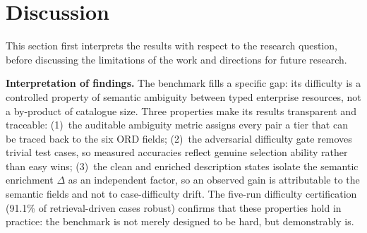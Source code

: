 \documentclass[10pt,twocolumn]{article}
\begin{document}
\section{Discussion}
\label{sec:discussion}

This section first interprets the results with respect to the research question, before discussing the limitations of the work and directions for future research.

\textbf{Interpretation of findings.} The benchmark fills a specific gap: its difficulty is a controlled property of semantic ambiguity between typed enterprise resources, not a by-product of catalogue size. Three properties make its results transparent and traceable: (1)~the auditable ambiguity metric assigns every pair a tier that can be traced back to the six ORD fields; (2)~the adversarial difficulty gate removes trivial test cases, so measured accuracies reflect genuine selection ability rather than easy wins; (3)~the clean and enriched description states isolate the semantic enrichment $\Delta$ as an independent factor, so an observed gain is attributable to the semantic fields and not to case-difficulty drift. The five-run difficulty certification (91.1\% of retrieval-driven cases robust) confirms that these properties hold in practice: the benchmark is not merely designed to be hard, but demonstrably is.
\end{document}
